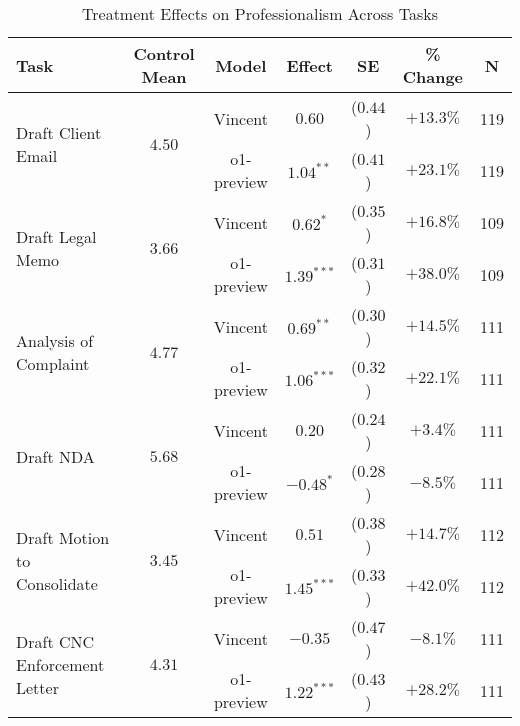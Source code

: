 \begin{table}[!htbp]
\centering
\caption{Treatment Effects on Professionalism Across Tasks}
\label{tab:professionalism_effects_controls}
\vspace{0.3cm}
\begin{tabular}{lcccccc}
\hline\hline
Task & Control Mean & Model & Effect & SE & \% Change & N \\
\hline
\multirow{2}{*}{Draft Client Email} & \multirow{2}{*}{$4.50$} & Vincent & $0.60$ & ($0.44$) & $+13.3\%$ & 119 \\
& & o1-preview & $1.04^{**}$ & ($0.41$) & $+23.1\%$ & 119 \\
\hline
\multirow{2}{*}{Draft Legal Memo} & \multirow{2}{*}{$3.66$} & Vincent & $0.62^{*}$ & ($0.35$) & $+16.8\%$ & 109 \\
& & o1-preview & $1.39^{***}$ & ($0.31$) & $+38.0\%$ & 109 \\
\hline
\multirow{2}{*}{Analysis of Complaint} & \multirow{2}{*}{$4.77$} & Vincent & $0.69^{**}$ & ($0.30$) & $+14.5\%$ & 111 \\
& & o1-preview & $1.06^{***}$ & ($0.32$) & $+22.1\%$ & 111 \\
\hline
\multirow{2}{*}{Draft NDA} & \multirow{2}{*}{$5.68$} & Vincent & $0.20$ & ($0.24$) & $+3.4\%$ & 111 \\
& & o1-preview & $-0.48^{*}$ & ($0.28$) & $-8.5\%$ & 111 \\
\hline
\multirow{2}{*}{Draft Motion to Consolidate} & \multirow{2}{*}{$3.45$} & Vincent & $0.51$ & ($0.38$) & $+14.7\%$ & 112 \\
& & o1-preview & $1.45^{***}$ & ($0.33$) & $+42.0\%$ & 112 \\
\hline
\multirow{2}{*}{Draft CNC Enforcement Letter} & \multirow{2}{*}{$4.31$} & Vincent & $-0.35$ & ($0.47$) & $-8.1\%$ & 111 \\
& & o1-preview & $1.22^{***}$ & ($0.43$) & $+28.2\%$ & 111 \\
\hline
\hline\hline
\end{tabular}

\vspace{0.5cm}


\end{table}

